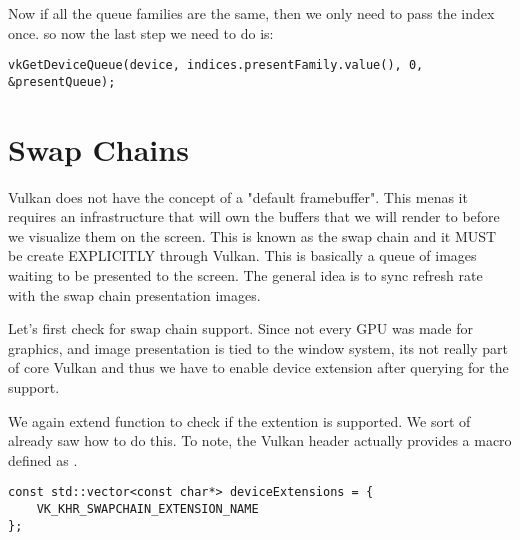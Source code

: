 \par Now if all the queue families are the same, then we only need to pass the index once. so now the last step we need to do is:

\begin{center}
\begin{minipage}{0.95\linewidth}
\begin{lstlisting}
vkGetDeviceQueue(device, indices.presentFamily.value(), 0, &presentQueue);
\end{lstlisting}
\end{minipage}
\end{center}

\section*{Swap Chains}

\par Vulkan does not have the concept of a "default framebuffer". This menas it requires an infrastructure that will own the buffers that we will render to before we visualize them on the screen. This is known as the swap chain and it MUST be create EXPLICITLY through Vulkan. This is basically a queue of images waiting to be presented to the screen. The general idea is to sync refresh rate with the swap chain presentation images.

\par Let's first check for swap chain support. Since not every GPU was made for graphics, and image presentation is tied to the window system, its not really part of core Vulkan and thus we have to enable  device extension after querying for the support.

\par We again extend  function to check if the extention is supported. We sort of already saw how to do this. To note, the Vulkan header actually provides a 
 macro defined as .

\begin{center}
\begin{minipage}{0.95\linewidth}
\begin{lstlisting}
const std::vector<const char*> deviceExtensions = {
    VK_KHR_SWAPCHAIN_EXTENSION_NAME
};
\end{lstlisting}
\end{minipage}
\end{center}


